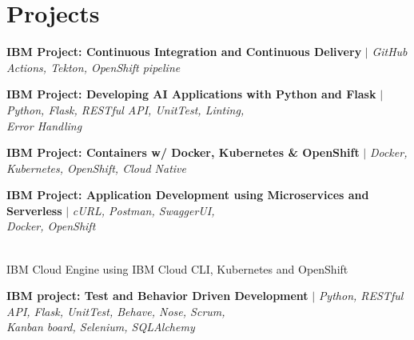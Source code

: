 \section{Projects}
\resumeSubHeadingListStart

    \resumeProjectHeading
    {\textbf{IBM Project: Continuous Integration and Continuous Delivery} $|$ \emph{GitHub Actions, Tekton, OpenShift pipeline}}{}
    \resumeItemListStart
    \resumeItemListEnd

    \resumeProjectHeading
    {\textbf{IBM Project: Developing AI Applications with Python and Flask} $|$ \emph{Python, Flask, RESTful API, UnitTest, Linting,}\\\emph{Error Handling}}{}
    \resumeItemListStart
    \resumeItemListEnd
    
    \resumeProjectHeading
    {\textbf{IBM Project: Containers w/ Docker, Kubernetes \& OpenShift} $|$ \emph{Docker, Kubernetes, OpenShift, Cloud Native}}{}
    \resumeItemListStart
    \resumeItemListEnd
    
    \resumeProjectHeading
    {\textbf{IBM Project: Application Development using Microservices and Serverless} $|$ \emph{cURL, Postman, SwaggerUI,}\\\emph{Docker, OpenShift}}{}
    
    \resumeItemListStart
        \\{IBM Cloud Engine using IBM Cloud CLI, Kubernetes and OpenShift}
    \resumeItemListEnd

    \resumeProjectHeading
    {\textbf{IBM project: Test and Behavior Driven Development} $|$ \emph{Python, RESTful API, Flask, UnitTest, Behave, Nose, Scrum,}\\\emph{  Kanban board, Selenium, SQLAlchemy}}{}
    
